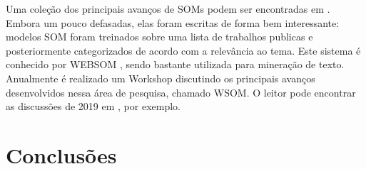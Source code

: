 \documentclass[conference]{IEEEtran}
\begin{document}
	Uma coleção dos principais avanços de SOMs podem ser encontradas em \cite{kaski1998bibliography, oja2003bibliography, polla2009bibliography}. Embora um pouco defasadas, elas foram escritas de forma bem interessante: modelos SOM foram treinados sobre uma lista de trabalhos publicas e posteriormente categorizados de acordo com a relevância ao tema. Este sistema é conhecido por WEBSOM \cite{kaski1998websom}, sendo bastante utilizada para mineração de texto. Anualmente é realizado um Workshop discutindo os principais avanços desenvolvidos nessa área de pesquisa, chamado WSOM. O leitor pode encontrar as discussões de 2019 em \cite{vellido2019advances}, por exemplo. 
	
			
	\section{Conclusões}


    
	
	
\end{document}
